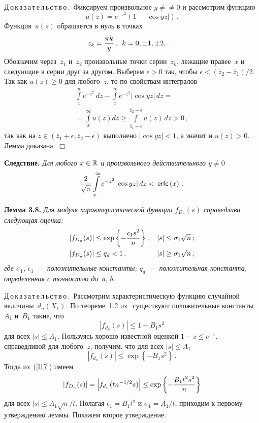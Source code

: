 \begin{multicols}{2}
\noindent
Д\,о\,к\,а\,з\,а\,т\,е\,л\,ь\,с\,т\,в\,о\,.\  Фиксируем произвольное $y\ne$\linebreak $\ne 0$ и рассмотрим функцию
$$
u(z) = e^{-z^2}\left(1-\left\vert \cos yz\right\vert \right)\,.
$$
Функция~$u(z)$ обращается в нуль в точках
$$
z_k=\displaystyle\frac{\displaystyle \pi k\mathstrut}{\displaystyle y\mathstrut}\,, \enskip k=0,\pm1,\pm2,\dots
$$
Обозначим через~$\bar{z}_1$ и~$\bar{z}_2$ произвольные точки серии~$z_k$, лежащие правее~$x$ и следующие 
в серии друг за другом. Выберем $\epsilon > 0$ так, чтобы $\epsilon < (\bar{z}_2-\bar{z}_1)/2$. 
Так как $u(z)\geq0$ для любого~$z$, то по свойствам интегралов
\begin{multline*}
\int\limits_x^{\infty} e^{-z^2}\,dz - \int\limits_x^{\infty} e^{-z^2}|\cos yz|\,dz ={}\\
{}= \int\limits_x^{\infty}u(z)dz \geq \int\limits_{\bar{z}_1+\epsilon}^{\bar{z}_2-\epsilon}u(z)\,dz > 0\,,
\end{multline*}
так как на $z \in (\bar{z}_1+\epsilon,\bar{z}_2-\epsilon)$ выполнено $|\cos yz|<1$, а значит и $u(z) > 0$.
Лемма доказана. \hfill $\Box$

\noindent

\textbf{Следствие.} \textit{Для любого $x\in{\mathbb{R}}$ и произвольного действительного $y\ne0$}
$$
\displaystyle\frac{\displaystyle 2\mathstrut}{\displaystyle \sqrt{\pi}\mathstrut}\int\limits_x^{\infty} e^{-z^2}|\cos yz|\,dz < \:{\sf erfc}\left(x\right)\,.
$$


\medskip

\noindent
\textbf{Лемма 3.8.}
\textit{Для модуля характеристической функции $f_{D_n}(s)$ справедлива следующая оценка:}
\begin{align*}
|f_{D_n}(s)| &\leq \exp\left\{-\displaystyle\frac{\displaystyle \epsilon_1 s^2\mathstrut}{\displaystyle n\mathstrut}\right\}\,,   & |s|&\leq\sigma_1 \sqrt{n}\,;\\ 
|f_{D_n}(s)| &\leq q_d < 1\,,  & |s|&\geq\sigma_1 \sqrt{n}\,, 
\end{align*}
\textit{где $\sigma_1$, $\epsilon_1$~--- положительные константы; $q_d$~--- положительная константа, 
определенная с точностью до~$a,\,b$.
}

\medskip

\noindent
Д\,о\,к\,а\,з\,а\,т\,е\,л\,ь\,с\,т\,в\,о\,.\  
Рассмотрим характеристическую функцию случайной величины~$d_n(X_1)$. По теореме~1.2 
из~\cite{petrov} существуют положительные константы~$A_1$ и~$B_1$ такие, что
$$
|f_{d_n}(s)| \leq 1 - B_1 s^2
$$
для всех $|s| \leq A_1$. Пользуясь хорошо известной оценкой $1-z\leq e^{-z}$, справедливой для любого~$z$, 
получим, что для всех $|s| \leq A_1$
$$
|f_{d_n}(s)| \leq \exp\left\{-B_1s^2\right\}\,.
$$
Тогда из~(\ref{l17}) имеем
$$
\left|f_{D_n}(s)\right| = \left|f_{d_n}(tn^{-1/2}s)\right| \leq \exp\left\{-\displaystyle\frac{\displaystyle B_1 t^2 s^2\mathstrut}{\displaystyle n\mathstrut}\right\}
$$
для всех $|s| \leq A_1 \sqrt{n}/t$. Полагая $\epsilon_1 = B_1 t^2$ и $\sigma_1 = A_1/t$, 
приходим к первому утверждению леммы. Покажем второе утверждение.


\end{multicols}
